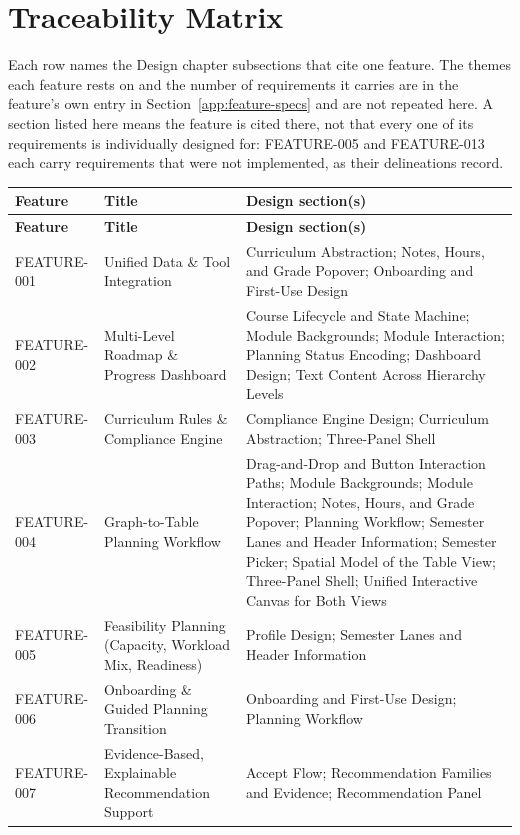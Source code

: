 \section{Traceability Matrix}
\label{app:traceability-matrix}
Each row names the Design chapter subsections that cite one feature. The themes each feature rests on and the number of requirements it carries are in the feature's own entry in Section~\ref{app:feature-specs} and are not repeated here. A section listed here means the feature is cited there, not that every one of its requirements is individually designed for: FEATURE-005 and FEATURE-013 each carry requirements that were not implemented, as their delineations record.

\small
\setlength{\tabcolsep}{4pt}
\begin{longtable}{@{}p{2.4cm}p{4.7cm}p{7.0cm}@{}}
\toprule
\textbf{Feature} & \textbf{Title} & \textbf{Design section(s)} \\
\midrule
\endfirsthead
\toprule
\textbf{Feature} & \textbf{Title} & \textbf{Design section(s)} \\
\midrule
\endhead
\bottomrule
\endfoot
FEATURE-001 & Unified Data \& Tool Integration & Curriculum Abstraction; Notes, Hours, and Grade Popover; Onboarding and First-Use Design \\
\addlinespace
FEATURE-002 & Multi-Level Roadmap \& Progress Dashboard & Course Lifecycle and State Machine; Module Backgrounds; Module Interaction; Planning Status Encoding; Dashboard Design; Text Content Across Hierarchy Levels \\
\addlinespace
FEATURE-003 & Curriculum Rules \& Compliance Engine & Compliance Engine Design; Curriculum Abstraction; Three-Panel Shell \\
\addlinespace
FEATURE-004 & Graph-to-Table Planning Workflow & Drag-and-Drop and Button Interaction Paths; Module Backgrounds; Module Interaction; Notes, Hours, and Grade Popover; Planning Workflow; Semester Lanes and Header Information; Semester Picker; Spatial Model of the Table View; Three-Panel Shell; Unified Interactive Canvas for Both Views \\
\addlinespace
FEATURE-005 & Feasibility Planning (Capacity, Workload Mix, Readiness) & Profile Design; Semester Lanes and Header Information \\
\addlinespace
FEATURE-006 & Onboarding \& Guided Planning Transition & Onboarding and First-Use Design; Planning Workflow \\
\addlinespace
FEATURE-007 & Evidence-Based, Explainable Recommendation Support & Accept Flow; Recommendation Families and Evidence; Recommendation Panel \\

\end{longtable}
